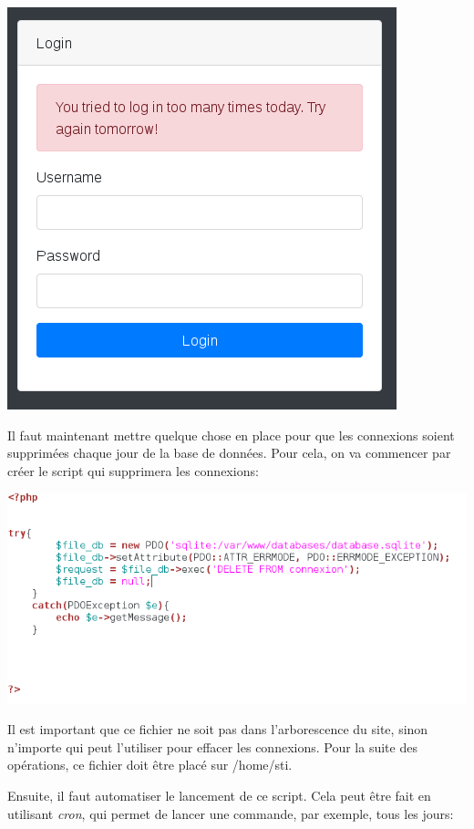 \documentclass{article}
\begin{document}
\includegraphics[width=\textwidth]{images/tentative_plus_10.PNG}

Il faut maintenant mettre quelque chose en place pour que les connexions
soient supprimées chaque jour de la base de données. Pour cela, on va
commencer par créer le script qui supprimera les connexions:

\includegraphics[width=\textwidth]{images/tentative_remove_connection.PNG}

Il est important que ce fichier ne soit pas dans l'arborescence du site,
sinon n'importe qui peut l'utiliser pour effacer les connexions. Pour la
suite des opérations, ce fichier doit être placé sur /home/sti.

Ensuite, il faut automatiser le lancement de ce script. Cela peut être
fait en utilisant \emph{cron}, qui permet de lancer une commande, par
exemple, tous les jours:
\end{document}
